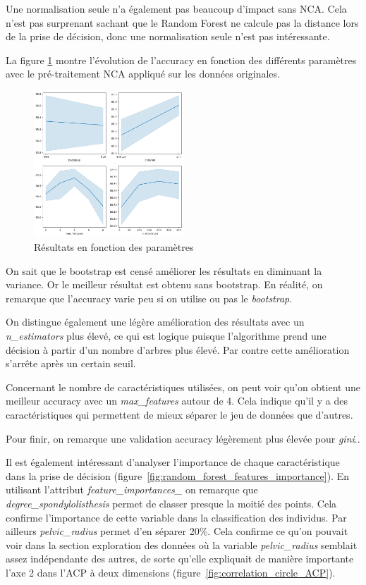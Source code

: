 \documentclass[twocolumn,10pt]{article}
\begin{document}
Une normalisation seule n'a également pas beaucoup d'impact sans NCA. Cela n'est pas surprenant sachant que le Random Forest ne calcule pas la distance lors de la prise de décision, donc une normalisation seule n'est pas intéressante.

La figure \ref{fig:random_forest_parameters} montre l'évolution de l'accuracy en fonction des différents paramètres avec le pré-traitement NCA appliqué sur les données originales.

\begin{figure}[htbp]
    \begin{center}
        \includegraphics[width=0.5\textwidth]{figures/random_forest_parameters.png}
        \caption{\label{fig:random_forest_parameters}Résultats en fonction des paramètres}
    \end{center}
\end{figure}

On sait que le bootstrap est censé améliorer les résultats en diminuant la variance. Or le meilleur résultat est obtenu sans bootstrap. En réalité, on remarque que l'accuracy varie peu si on utilise ou pas le \textit{bootstrap}.

On distingue également une légère amélioration des résultats avec un \textit{n\_estimators} plus élevé, ce qui est logique puisque l'algorithme prend une décision à partir d'un nombre d'arbres plus élevé. Par contre cette amélioration s'arrête après un certain seuil.

Concernant le nombre de caractéristiques utilisées, on peut voir qu'on obtient une meilleur accuracy avec un \textit{max\_features} autour de 4. Cela indique qu'il y a des caractéristiques qui permettent de mieux séparer le jeu de données que d'autres.

Pour finir, on remarque une validation accuracy légèrement plus élevée pour \textit{gini}..

Il est également intéressant d'analyser l'importance de chaque caractéristique dans la prise de décision (figure~\ref{fig:random_forest_features_importance}).
En utilisant l'attribut \textit{feature\_importances\_} on remarque que \textit{degree\_spondylolisthesis} permet de classer presque la moitié des points. Cela confirme l'importance de cette variable dans la classification des individus. Par ailleurs \textit{pelvic\_radius} permet d'en séparer 20\%. Cela confirme ce qu'on pouvait voir dans la section exploration des données où la variable \textit{pelvic\_radius} semblait assez indépendante des autres, de sorte qu'elle expliquait de manière importante l'axe 2 dans l'ACP à deux dimensions (figure~\ref{fig:correlation_circle_ACP}).
\end{document}

